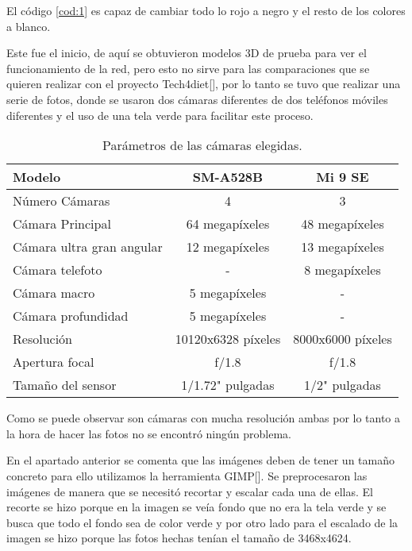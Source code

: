 El código \ref{cod:1} es capaz de cambiar todo lo rojo a negro y el resto de los colores a blanco.

Este fue el inicio, de aquí se obtuvieron modelos 3D de prueba para ver el funcionamiento de la red, pero esto no sirve para las comparaciones que se quieren realizar con el proyecto Tech4diet[\cite{tech}], por lo tanto se tuvo que realizar una serie de fotos, donde se usaron dos cámaras diferentes de dos teléfonos móviles diferentes y el uso de una tela verde para facilitar este proceso.



\begin{table}[ht]
	\centering
	{
		\begin{tabular}{@{}lcc@{}}
			\toprule
			Modelo						& 	SM-A528B			&	Mi 9 SE	 	\\ \midrule
			Número Cámaras 				& 	4           		& 	3           	\\
			Cámara Principal			&  64 megapíxeles   	& 48 megapíxeles         	 	\\
			Cámara ultra gran angular 	&  12 megapíxeles		& 13 megapíxeles	\\
			Cámara telefoto		 		&  -					& 8 megapíxeles		\\
			Cámara macro			 	&  5 megapíxeles		& -					\\
			Cámara profundidad		 	&  5 megapíxeles		& -					\\
			Resolución					&  10120x6328 píxeles	& 8000x6000 píxeles		\\
			Apertura focal				&	f/1.8				& f/1.8					\\
			Tamaño del sensor			& 1/1.72" pulgadas		& 1/2" pulgadas			\\ \bottomrule
		\end{tabular}
	}
	\caption{Parámetros de las cámaras elegidas.}
	\label{tablacamara}
\end{table}
\FloatBarrier

Como se puede observar son cámaras con mucha resolución ambas por lo tanto a la hora de hacer las fotos no se encontró ningún problema.

En el apartado anterior se comenta que las imágenes deben de tener un tamaño concreto para ello utilizamos la herramienta GIMP[]. Se preprocesaron las imágenes de manera que se necesitó recortar y escalar cada una de ellas. El recorte se hizo porque en la imagen se veía fondo que no era la tela verde y se busca que todo el fondo sea de color verde y por otro lado para el escalado de la imagen se hizo porque las fotos hechas tenían el tamaño de 3468x4624.

